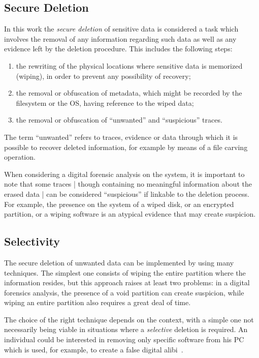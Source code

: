 \documentclass[10pt, conference, compsocconf]{IEEEtran}
\begin{document}
\subsection{Secure Deletion}
\label{secdel}
In this work the \textit{secure deletion} of sensitive data is considered a task which involves the removal of any information regarding such data as well as any evidence left by the deletion procedure. This includes the following steps:
\begin{enumerate}
 \item the rewriting of the physical locations where sensitive data is memorized (wiping), in order to prevent any possibility of recovery;
 \item the removal or obfuscation of metadata, which might be recorded by the filesystem or the OS, having reference to the wiped data;
 \item the removal or obfuscation of ``unwanted'' and ``suspicious'' traces.
\end{enumerate}

The term ``unwanted'' refers to traces, evidence or data through which it is possible to recover deleted information, for example by means of a file carving operation. %

When considering a digital forensic analysis on the system, it is important to note that some traces | though containing no meaningful information about the erased data | can be considered ``suspicious'' if linkable to the deletion process. %
For example, the presence on the system of a wiped disk, or an encrypted partition, or a wiping software is an atypical evidence that may create suspicion.

\subsection{Selectivity}
The secure deletion of unwanted data can be implemented by using many techniques. The simplest one consists of wiping the entire partition where the information resides, but this approach raises at least two problems: in a digital forensics analysis, the presence of a void partition can create suspicion, while wiping an entire partition also requires a great deal of time.

The choice of the right technique depends on the context, with a simple one not necessarily being viable in situations where a \textit{selective} deletion is required. An individual could be interested in removing only specific software from his PC which is used, for example, to create a false digital alibi~\cite{autoalibi}.
\end{document}
